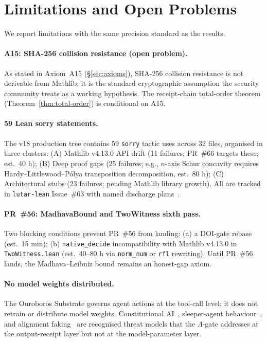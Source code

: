 \documentclass[11pt,letterpaper]{article}
\theoremstyle{definition}
\theoremstyle{remark}
\begin{document}
\section{Limitations and Open Problems}
\label{sec:limitations}

We report limitations with the same precision standard as the results.

\paragraph{A15: SHA-256 collision resistance (open problem).}
As stated in Axiom~A15 (\S\ref{sec:axioms}), SHA-256 collision
resistance is not derivable from Mathlib; it is the standard
cryptographic assumption the security community treats as a working
hypothesis.
The receipt-chain total-order theorem (Theorem~\ref{thm:total-order})
is conditional on A15.

\paragraph{59 Lean sorry statements.}
The v18 production tree contains 59 \texttt{sorry} tactic uses
across 32 files, organised in three clusters:
(A) Mathlib v4.13.0 API drift (11 failures; PR~\#66 targets these;
est.\ 40 h);
(B) Deep proof gaps (25 failures; e.g., \(n\)-axis Schur concavity
requires Hardy--Littlewood--P{\'o}lya transposition decomposition,
est.\ 80 h);
(C) Architectural stubs (23 failures; pending Mathlib library growth).
All are tracked in \texttt{lutar-lean} Issue~\#63 with named discharge
plans~\cite{LutarThesisV18}.

\paragraph{PR~\#56: MadhavaBound and TwoWitness sixth pass.}
Two blocking conditions prevent PR~\#56 from landing:
(a) a DOI-gate rebase (est.\ 15 min);
(b) \texttt{native\_decide} incompatibility with Mathlib v4.13.0 in
\texttt{TwoWitness.lean} (est.\ 40--80 h via \texttt{norm\_num} or
\texttt{rfl} rewriting).
Until PR~\#56 lands, the Madhava--Leibniz bound remains an honest-gap
axiom.

\paragraph{No model weights distributed.}
The Ouroboros Substrate governs agent actions at the tool-call level;
it does not retrain or distribute model weights.
Constitutional AI~\cite{Anthropic2022Constitutional},
sleeper-agent behaviour~\cite{Hubinger2024}, and alignment
faking~\cite{Greenblatt2024} are recognised threat models that the
\(\Lambda\)-gate addresses at the output-receipt layer but not at the
model-parameter layer.
\end{document}

